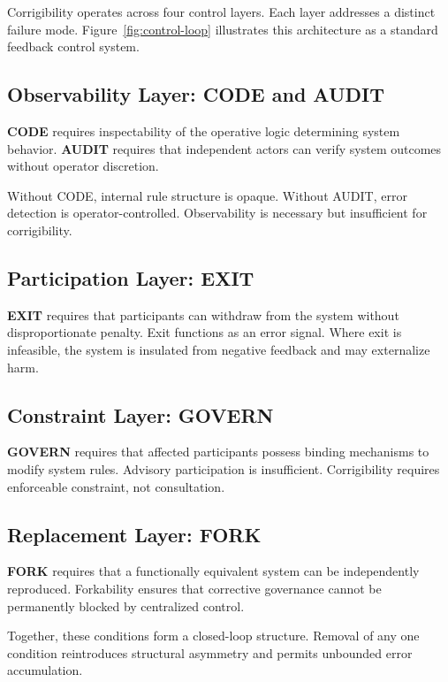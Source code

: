 \documentclass{article}
\begin{document}
Corrigibility operates across four control layers. Each layer addresses a distinct failure mode. Figure~\ref{fig:control-loop} illustrates this architecture as a standard feedback control system.

\subsection{Observability Layer: CODE and AUDIT}

\textbf{CODE} requires inspectability of the operative logic determining system behavior. \textbf{AUDIT} requires that independent actors can verify system outcomes without operator discretion.

Without CODE, internal rule structure is opaque. Without AUDIT, error detection is operator-controlled. Observability is necessary but insufficient for corrigibility.

\subsection{Participation Layer: EXIT}

\textbf{EXIT} requires that participants can withdraw from the system without disproportionate penalty. Exit functions as an error signal. Where exit is infeasible, the system is insulated from negative feedback and may externalize harm.

\subsection{Constraint Layer: GOVERN}

\textbf{GOVERN} requires that affected participants possess binding mechanisms to modify system rules. Advisory participation is insufficient. Corrigibility requires enforceable constraint, not consultation.

\subsection{Replacement Layer: FORK}

\textbf{FORK} requires that a functionally equivalent system can be independently reproduced. Forkability ensures that corrective governance cannot be permanently blocked by centralized control.

Together, these conditions form a closed-loop structure. Removal of any one condition reintroduces structural asymmetry and permits unbounded error accumulation.
\end{document}
